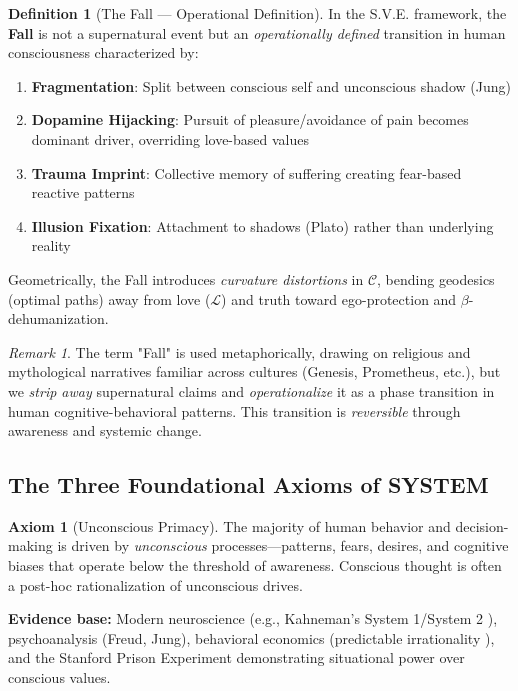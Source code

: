 \documentclass[11pt,a4paper]{article}
\newcommand{\SYSTEM}{\textbf{SYSTEM}}
\newcommand{\betaDehum}{$\beta$-dehumanization}
\newcommand{\CC}{$\mathcal{C}$}
\newcommand{\Love}{$\mathcal{L}$}
\theoremstyle{definition}
\newtheorem{definition}{Definition}[section]
\newtheorem{axiom}{Axiom}[section]
\theoremstyle{remark}
\newtheorem{remark}{Remark}[section]
\begin{document}
\begin{definition}[The Fall — Operational Definition]
\label{def:fall}
In the S.V.E. framework, the \textbf{Fall} is not a supernatural event but an \textit{operationally defined} transition in human consciousness characterized by:

\begin{enumerate}
\item \textbf{Fragmentation}: Split between conscious self and unconscious shadow (Jung)
\item \textbf{Dopamine Hijacking}: Pursuit of pleasure/avoidance of pain becomes dominant driver, overriding love-based values
\item \textbf{Trauma Imprint}: Collective memory of suffering creating fear-based reactive patterns
\item \textbf{Illusion Fixation}: Attachment to shadows (Plato) rather than underlying reality
\end{enumerate}

Geometrically, the Fall introduces \textit{curvature distortions} in \CC{}, bending geodesics (optimal paths) away from love (\Love{}) and truth toward ego-protection and \betaDehum{}.
\end{definition}

\begin{remark}
The term "Fall" is used metaphorically, drawing on religious and mythological narratives familiar across cultures (Genesis, Prometheus, etc.), but we \textit{strip away} supernatural claims and \textit{operationalize} it as a phase transition in human cognitive-behavioral patterns. This transition is \textit{reversible} through awareness and systemic change.
\end{remark}

\subsection{The Three Foundational Axioms of \SYSTEM{}}

\begin{axiom}[Unconscious Primacy]
\label{ax:unconscious_primacy}
The majority of human behavior and decision-making is driven by \textit{unconscious} processes—patterns, fears, desires, and cognitive biases that operate below the threshold of awareness. Conscious thought is often a post-hoc rationalization of unconscious drives.

\textbf{Evidence base:} Modern neuroscience (e.g., Kahneman's System 1/System 2 \cite{kahneman}), psychoanalysis (Freud, Jung), behavioral economics (predictable irrationality \cite{ariely}), and the Stanford Prison Experiment \cite{spe} demonstrating situational power over conscious values.
\end{axiom}
\end{document}
